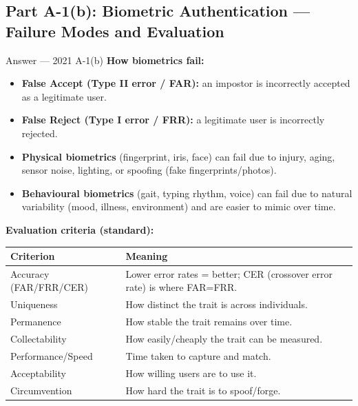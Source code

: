 \documentclass[12pt,a4paper]{article}
\begin{document}
\subsection{Part A-1(b): Biometric Authentication --- Failure Modes and Evaluation}
\begin{solbox}{Answer --- 2021 A-1(b)}
\textbf{How biometrics fail:}
\begin{itemize}[noitemsep]
  \item \textbf{False Accept (Type II error / FAR):} an impostor is incorrectly accepted as a legitimate user.
  \item \textbf{False Reject (Type I error / FRR):} a legitimate user is incorrectly rejected.
  \item \textbf{Physical biometrics} (fingerprint, iris, face) can fail due to injury, aging, sensor noise, lighting, or spoofing (fake fingerprints/photos).
  \item \textbf{Behavioural biometrics} (gait, typing rhythm, voice) can fail due to natural variability (mood, illness, environment) and are easier to mimic over time.
\end{itemize}

\textbf{Evaluation criteria (standard):}
\begin{center}
\renewcommand{\arraystretch}{1.2}
\begin{tabular}{l|p{9cm}}
\toprule
Criterion & Meaning \\
\midrule
Accuracy (FAR/FRR/CER) & Lower error rates = better; CER (crossover error rate) is where FAR=FRR. \\
Uniqueness & How distinct the trait is across individuals. \\
Permanence & How stable the trait remains over time. \\
Collectability & How easily/cheaply the trait can be measured. \\
Performance/Speed & Time taken to capture and match. \\
Acceptability & How willing users are to use it. \\
Circumvention & How hard the trait is to spoof/forge. \\
\bottomrule
\end{tabular}
\end{center}
\end{solbox}
\end{document}
